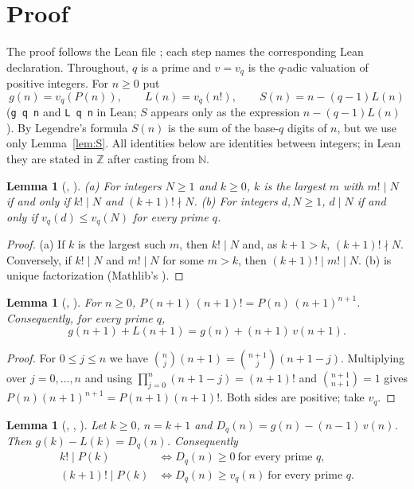 \documentclass[11pt]{amsart}
\theoremstyle{plain}
\newtheorem{lemma}[theorem]{Lemma}
\theoremstyle{definition}
\newcommand{\N}{\mathbb{N}}
\newcommand{\Z}{\mathbb{Z}}
\begin{document}
\section{Proof}\label{sec:proof}

The proof follows the Lean file ; each step names the corresponding Lean declaration.
Throughout, $q$ is a prime and $v=v_q$ is the $q$-adic valuation of positive integers. For $n\ge0$ put
\[
  g(n)=v_q(P(n)),\qquad L(n)=v_q(n!),\qquad S(n)=n-(q-1)L(n)
\]
(\texttt{g q n} and \texttt{L q n} in Lean; $S$ appears only as the expression $n-(q-1)L(n)$). By Legendre's formula $S(n)$ is the sum of the base-$q$ digits of $n$, but we use only Lemma~\ref{lem:S}. All identities below are identities between integers; in Lean they are stated in $\Z$ after casting from $\N$.

\begin{lemma}[, ]\label{lem:red}
\textup{(a)} For integers $N\ge1$ and $k\ge0$, $k$ is the largest $m$ with $m!\mid N$ if and only if $k!\mid N$ and $(k+1)!\nmid N$.
\textup{(b)} For integers $d,N\ge1$, $d\mid N$ if and only if $v_q(d)\le v_q(N)$ for every prime $q$.
\end{lemma}

\begin{proof}
(a) If $k$ is the largest such $m$, then $k!\mid N$ and, as $k+1>k$, $(k+1)!\nmid N$. Conversely, if $k!\mid N$ and $m!\mid N$ for some $m>k$, then $(k+1)!\mid m!\mid N$. (b) is unique factorization (Mathlib's ).
\end{proof}

\begin{lemma}[, ]\label{lem:rec}
For $n\ge0$, $P(n+1)\,(n+1)!=P(n)\,(n+1)^{n+1}$. Consequently, for every prime $q$,
\begin{equation}\label{eq:rec}
  g(n+1)+L(n+1)=g(n)+(n+1)\,v(n+1).
\end{equation}
\end{lemma}

\begin{proof}
For $0\le j\le n$ we have $\binom nj(n+1)=\binom{n+1}{j}(n+1-j)$. Multiplying over $j=0,\dots,n$ and using $\prod_{j=0}^{n}(n+1-j)=(n+1)!$ and $\binom{n+1}{n+1}=1$ gives $P(n)(n+1)^{n+1}=P(n+1)(n+1)!$. Both sides are positive; take $v_q$.
\end{proof}

\begin{lemma}[, , ]\label{lem:D}
Let $k\ge0$, $n=k+1$ and $D_q(n)=g(n)-(n-1)\,v(n)$. Then $g(k)-L(k)=D_q(n)$. Consequently
\begin{align}
  k!\mid P(k)&\iff D_q(n)\ge0\ \text{for every prime } q,\label{eq:div1}\\
  (k+1)!\mid P(k)&\iff D_q(n)\ge v_q(n)\ \text{for every prime } q.\label{eq:div2}
\end{align}
\end{lemma}
\end{document}
